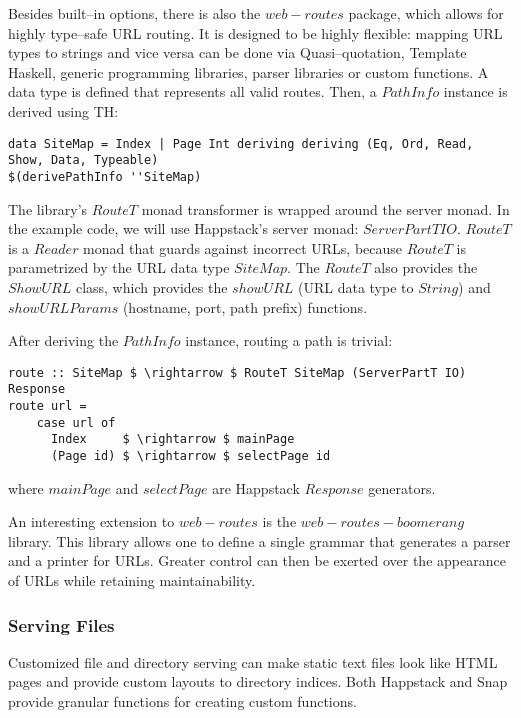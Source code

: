 Besides built--in options, there is also the $ web-routes $ package, which allows for highly type--safe URL routing.
It is designed to be highly flexible: mapping URL types to strings and vice versa can be done via Quasi--quotation, Template Haskell, generic programming libraries, parser libraries or custom functions.
A data type is defined that represents all valid routes. Then, a $ PathInfo $ instance is derived using TH:

\begin{lstlisting}
data SiteMap = Index | Page Int deriving deriving (Eq, Ord, Read, Show, Data, Typeable)
$(derivePathInfo ''SiteMap)
\end{lstlisting}

The library's $ RouteT $ monad transformer is wrapped around the server monad. In the example code, we will use Happstack's server monad: $ ServerPartT IO $.
$ RouteT $ is a $ Reader $ monad that guards against incorrect URLs, because $ RouteT $ is parametrized by the URL data type $ SiteMap $.
The $ RouteT $ also provides the $ ShowURL $ class, which provides the $ showURL $ (URL data type to $ String $) and $ showURLParams $ (hostname, port, path prefix) functions.

After deriving the $ PathInfo $ instance, routing a path is trivial:

\begin{lstlisting}[mathescape=true]
route :: SiteMap $ \rightarrow $ RouteT SiteMap (ServerPartT IO) Response
route url =
    case url of
      Index     $ \rightarrow $ mainPage
      (Page id) $ \rightarrow $ selectPage id
\end{lstlisting}

\noindent where $ mainPage $ and $ selectPage $ are Happstack $ Response $ generators.

An interesting extension to $ web-routes $ is the $ web-routes-boomerang $ library.
This library allows one to define a single grammar that generates a parser and a printer for URLs.
Greater control can then be exerted over the appearance of URLs while retaining maintainability. 
             
\subsubsection{Serving Files}
Customized file and directory serving can make static text files look like HTML pages and provide custom layouts to directory indices.
Both Happstack and Snap provide granular functions for creating custom functions.

